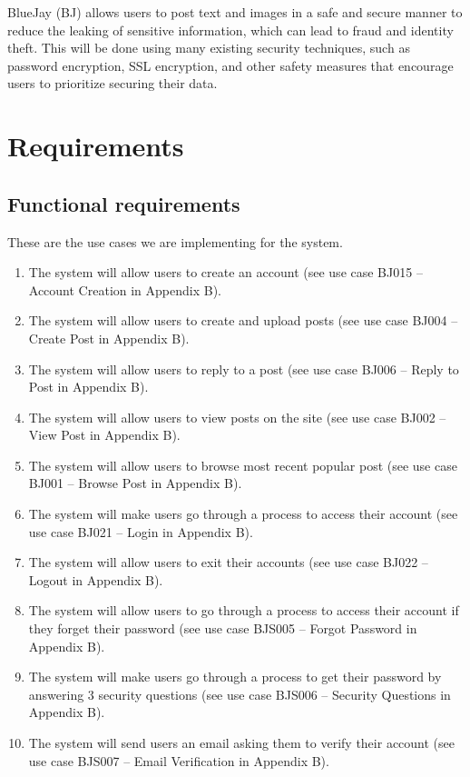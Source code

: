 \documentclass{report}
\begin{document}
	BlueJay (BJ) allows users to post text and images in a safe and secure manner to reduce the leaking of sensitive information,
	which can lead to fraud and identity theft.
	This will be done using many existing security techniques, such as password encryption, SSL encryption,
	and other safety measures that encourage users to prioritize securing their data.
\section{Requirements}
	\subsection{Functional requirements}
	These are the use cases we are implementing for the system.
	\begin{enumerate}
		\item The system will allow users to create an account (see use case BJ015 – Account Creation in Appendix B).
		\item The system will allow users to create and upload posts (see use case BJ004 – Create Post in Appendix B).
		\item The system will allow users to reply to a post (see use case BJ006 – Reply to Post in Appendix B).
		\item The system will allow users to view posts on the site (see use case BJ002 – View Post in Appendix B).
		\item The system will allow users to browse most recent popular post (see use case BJ001 – Browse Post in Appendix B).
		\item The system will make users go through a process to access their account (see use case BJ021 – Login in Appendix B).
		\item The system will allow users to exit their accounts (see use case BJ022 – Logout in Appendix B).
		\item The system will allow users to go through a process to access their account if they forget their password (see use case BJS005 – Forgot Password in Appendix B).
		\item The system will make users go through a process to get their password by answering 3 security questions (see use case BJS006 – Security Questions in Appendix B).
		\item The system will send users an email asking them to verify their account (see use case BJS007 – Email Verification in Appendix B).
	\end{enumerate}
\end{document}

